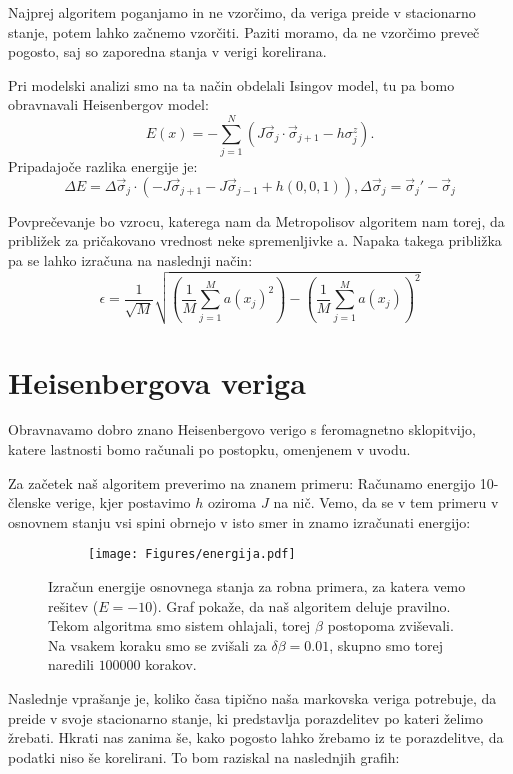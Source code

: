 \documentclass{article}
\begin{document}
Najprej algoritem poganjamo in ne vzorčimo, da veriga preide v stacionarno stanje, potem lahko začnemo vzorčiti. Paziti moramo, da ne vzorčimo preveč pogosto, saj so zaporedna stanja v verigi korelirana.

Pri modelski analizi smo na ta način obdelali Isingov model, tu pa bomo obravnavali Heisenbergov model:
\begin{equation*}
E(x) = - \sum_{j=1}^N (J \vec{\sigma}_j \cdot \vec{\sigma}_{j+1} - h \sigma_j^z).
\end{equation*}
Pripadajoče razlika energije je:
\begin{equation*}
\Delta E = \Delta\vec{\sigma}_j \cdot (-J \vec{\sigma}_{j+1} - J \vec{\sigma}_{j-1} + h (0,0,1)), \Delta \vec{\sigma}_j = \vec{\sigma}_j' - \vec{\sigma}_j
\end{equation*}

Povprečevanje bo vzrocu, katerega nam da Metropolisov algoritem nam torej, da približek za pričakovano vrednost neke spremenljivke a.
Napaka takega približka pa se lahko izračuna na naslednji način:
\begin{equation*}
\epsilon = \frac{1}{\sqrt{M}} \sqrt{\left( \frac{1}{M} \sum_{j=1}^M a(x_j)^2 \right) - \left( \frac{1}{M} \sum_{j=1}^M a(x_j) \right)^2}
\end{equation*}

\section*{Heisenbergova veriga}

Obravnavamo dobro znano Heisenbergovo verigo s feromagnetno sklopitvijo, katere lastnosti bomo računali po postopku, omenjenem v uvodu.

Za začetek naš algoritem preverimo na znanem primeru: Računamo energijo 10-členske verige, kjer postavimo $h$ oziroma $J$ na nič. Vemo, da se v tem primeru v osnovnem stanju vsi spini obrnejo v isto smer in znamo izračunati energijo:
\begin{figure}[H]
\centering
\begin{subfigure}{.7\textwidth}
\texttt{[image: Figures/energija.pdf]}
\end{subfigure}
\caption*{Izračun energije osnovnega stanja za robna primera, za katera vemo rešitev ($E=-10$). Graf pokaže, da naš algoritem deluje pravilno. Tekom algoritma smo sistem ohlajali, torej $\beta$ postopoma zviševali. Na vsakem koraku smo se zvišali za $\delta \beta = 0.01$, skupno smo torej naredili $100000$ korakov.}
\end{figure}
Naslednje vprašanje je, koliko časa tipično naša markovska veriga potrebuje, da preide v svoje stacionarno stanje, ki predstavlja porazdelitev po kateri želimo žrebati. Hkrati nas zanima še, kako pogosto lahko žrebamo iz te porazdelitve, da podatki niso še korelirani. To bom raziskal na naslednjih grafih:
\end{document}
